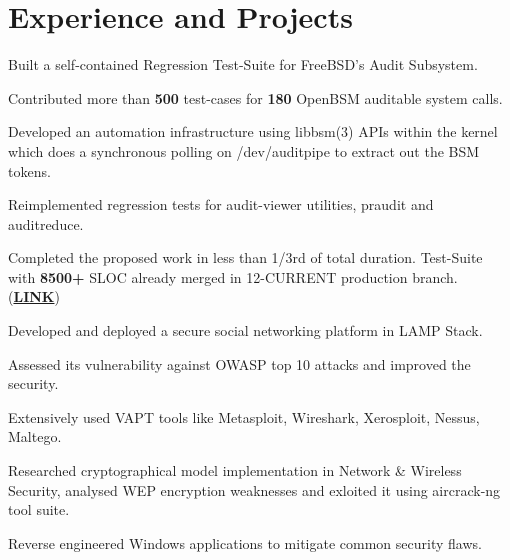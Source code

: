 \documentclass[]{deedy-resume-openfont}
\begin{document}
\begin{minipage}[t]{0.70\textwidth}

\vspace{-0.7cm}
\section{Experience and Projects}
\vspace{\topsep} %
\begin{tightemize}
  \item Built a self-contained Regression Test-Suite for FreeBSD's Audit Subsystem.
  \item Contributed more than \textbf{500} test-cases for \textbf{180} OpenBSM auditable system calls.
  \item Developed an automation infrastructure using libbsm(3) APIs within the kernel which does a synchronous polling on /dev/auditpipe to extract out the BSM tokens.
  \item Reimplemented regression tests for audit-viewer utilities, praudit and auditreduce.
  \item	Completed the proposed work in less than 1/3rd of total duration. Test-Suite with \textbf{8500+} SLOC already merged in 12-CURRENT production branch. (\href{https://github.com/freebsd/freebsd/tree/master/tests/sys/audit}{\textbf{LINK}})
\end{tightemize}

\vspace{0.1cm}
\vspace{0cm} %
\begin{tightemize}
  \item Developed and deployed a secure social networking platform in LAMP Stack.
  \item Assessed its vulnerability against OWASP top 10 attacks and improved the security.
  \item Extensively used VAPT tools like Metasploit, Wireshark, Xerosploit, Nessus, Maltego.
  \item	Researched cryptographical model implementation in Network \& Wireless Security, analysed WEP encryption weaknesses and exloited it using aircrack-ng tool suite.
  \item Reverse engineered Windows applications to mitigate common security flaws.
\end{tightemize}


\end{minipage}
\end{document}
